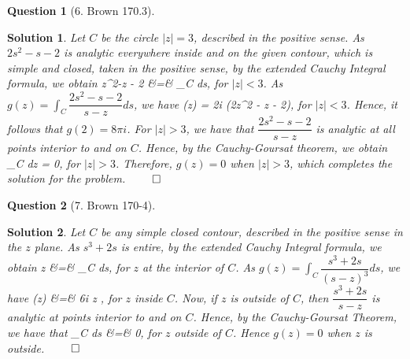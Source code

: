 \documentclass{article} %
\def\eQb#1\eQe{\begin{eqnarray*}#1\end{eqnarray*}}
\theoremstyle{quest}
\newtheorem*{question}{Question}
\newtheorem*{solution}{Solution}
\begin{document}
\bigskip

\begin{question}[6. Brown 170.3]
\end{question}
\begin{solution}
Let $C$ be the circle $|z| = 3$, described in the positive sense.
As $2s^2 - s - 2$ is analytic everywhere inside and on the given contour,
which is simple and closed, taken in the positive sense, by the 
extended Cauchy Integral formula, we obtain 
\eQb
2z^2-z - 2 &=&  \int_{C}  ds,
\eQe 
for $|z| < 3$. As $g(z) = \int_{C} \dfrac{2s^2 - s - 2}{s-z} ds$, we have
\eQb
g(z) = 2\pi i (2z^2 - z - 2),
\eQe 
for $|z| < 3$. Hence, it follows that $g(2) = 8\pi i$. For $|z| > 3$,
we have that $\dfrac{2s^2 - s -2 }{s - z}$ is analytic at all points 
interior to and on $C$. Hence, by the Cauchy-Goursat theorem, we obtain
\eQb
\int_{C}  dz = 0,
\eQe 
for $|z| > 3$. Therefore, $g(z) = 0$ when $|z| > 3$,
which completes the solution for the problem. $\qed$
\end{solution}

\bigskip

\begin{question}[7. Brown 170-4]
\end{question}
\begin{solution}
Let $C$ be any simple closed contour, described in the positive sense
in the $z$ plane. As $s^3 + 2s$ is entire, by the extended Cauchy Integral
formula, we obtain
\eQb
6z &=&  \int_{C}  ds,
\eQe
for $z$ at the interior of $C$. 
As $g(z) = \int_{C} \dfrac{s^3 +2s}{(s-z)^3} ds$, we have 
\eQb
g(z) &=& 6\pi i z ,
\eQe
for $z$ inside $C$. 
Now, if $z$ is outside of $C$, then $\dfrac{s^3 + 2s}
{s-z}$ is analytic at points interior to and on $C$. Hence, by
the Cauchy-Goursat Theorem, we have that
\eQb
\int_{C}  ds &=& 0,
\eQe
for $z$ outside of $C$. 
Hence $g(z) = 0$ when $z$ is outside. $\qed$
\end{solution}
\end{document}
